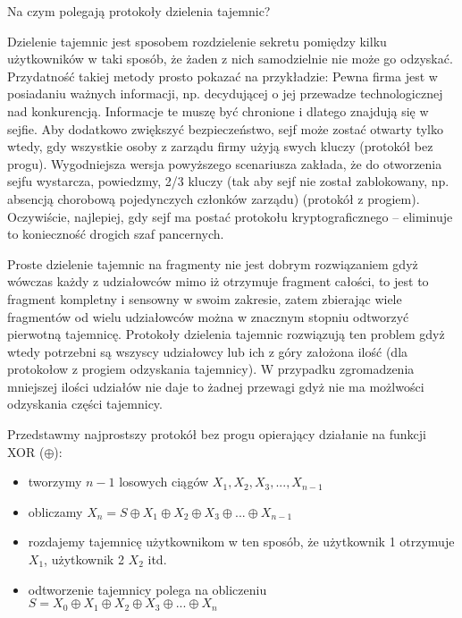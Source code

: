 \documentclass[answers,11pt]{exam}
\begin{document}
\begin{questions}

\question Na czym polegają protokoły dzielenia tajemnic? 
\begin{solution}
Dzielenie tajemnic jest sposobem rozdzielenie sekretu pomiędzy kilku użytkowników w taki sposób, że żaden z nich samodzielnie nie może go odzyskać. Przydatność takiej metody prosto pokazać na przykładzie: Pewna firma jest w posiadaniu ważnych informacji, np. decydującej o jej przewadze technologicznej nad konkurencją. Informacje te muszę być chronione i dlatego znajdują się w sejfie. Aby dodatkowo zwiększyć bezpieczeństwo, sejf może zostać otwarty tylko wtedy, gdy wszystkie osoby z zarządu firmy użyją swych kluczy (protokół bez progu). Wygodniejsza wersja powyższego scenariusza zakłada, że do otworzenia sejfu wystarcza, powiedzmy, 2/3 kluczy (tak aby sejf nie został zablokowany, np. absencją chorobową pojedynczych członków zarządu) (protokół z progiem). Oczywiście, najlepiej, gdy sejf ma postać protokołu kryptograficznego – eliminuje to konieczność drogich szaf pancernych.
\end{solution}

\begin{solution}
Proste dzielenie tajemnic na fragmenty nie jest dobrym rozwiązaniem gdyż wówczas każdy z udziałowców mimo iż otrzymuje fragment całości, to jest to fragment kompletny i sensowny w swoim zakresie, zatem zbierając wiele fragmentów od wielu udziałowców można w znacznym stopniu odtworzyć pierwotną tajemnicę. Protokoły dzielenia tajemnic rozwiązują ten problem gdyż wtedy potrzebni są wszyscy udziałowcy lub ich z góry założona ilość (dla protokołow z progiem odzyskania tajemnicy). W przypadku zgromadzenia mniejszej ilości udziałów nie daje to żadnej przewagi gdyż nie ma możlwości odzyskania części tajemnicy.
\end{solution}

\begin{solution}
Przedstawmy najprostszy protokół bez progu opierający działanie na funkcji XOR ($\oplus$):
\begin{itemize}
\item tworzymy $n-1$ losowych ciągów $X_1, X_2, X_3, ..., X_{n-1}$
\item obliczamy $X_n = S \oplus X_1 \oplus X_2 \oplus X_3 \oplus ... \oplus X_{n-1}$ 
\item rozdajemy tajemnicę użytkownikom w ten sposób, że użytkownik 1 otrzymuje $X_1$, użytkownik 2 $X_2$ itd.
\item odtworzenie tajemnicy polega na obliczeniu $S = X_0 \oplus X_1 \oplus X_2 \oplus X_3 \oplus ... \oplus X_{n}$
\end{itemize}
\end{solution}


\end{questions}
\end{document}
